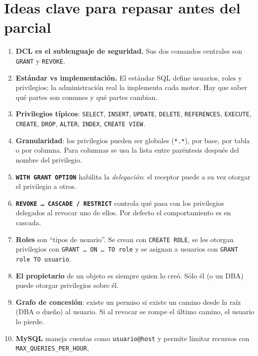 \documentclass[11pt,a4paper]{article}
\begin{document}
\section{Ideas clave para repasar antes del parcial}

\begin{enumerate}
    \item \textbf{DCL es el sublenguaje de seguridad.} Sus dos comandos
    centrales son \texttt{GRANT} y \texttt{REVOKE}.
    \item \textbf{Estándar vs implementación.} El estándar SQL define
    usuarios, roles y privilegios; la administración real la implementa
    cada motor. Hay que saber qué partes son comunes y qué partes
    cambian.
    \item \textbf{Privilegios típicos}: \texttt{SELECT}, \texttt{INSERT},
    \texttt{UPDATE}, \texttt{DELETE}, \texttt{REFERENCES},
    \texttt{EXECUTE}, \texttt{CREATE}, \texttt{DROP}, \texttt{ALTER},
    \texttt{INDEX}, \texttt{CREATE VIEW}.
    \item \textbf{Granularidad}: los privilegios pueden ser globales
    (\texttt{*.*}), por base, por tabla o por columna. Para columnas se
    usa la lista entre paréntesis después del nombre del privilegio.
    \item \textbf{\texttt{WITH GRANT OPTION}} habilita la
    \emph{delegación}: el receptor puede a su vez otorgar el privilegio
    a otros.
    \item \textbf{\texttt{REVOKE \dots\ CASCADE / RESTRICT}} controla
    qué pasa con los privilegios delegados al revocar uno de ellos.
    Por defecto el comportamiento es en cascada.
    \item \textbf{Roles} son ``tipos de usuario''. Se crean con
    \texttt{CREATE ROLE}, se les otorgan privilegios con \texttt{GRANT
    \dots\ ON \dots\ TO role} y se asignan a usuarios con
    \texttt{GRANT role TO usuario}.
    \item \textbf{El propietario} de un objeto es siempre quien lo
    creó. Sólo él (o un DBA) puede otorgar privilegios sobre él.
    \item \textbf{Grafo de concesión}: existe un permiso si existe un
    camino desde la raíz (DBA o dueño) al usuario. Si al revocar se
    rompe el último camino, el usuario lo pierde.
    \item \textbf{MySQL} maneja cuentas como \texttt{usuario@host} y
    permite limitar recursos con \texttt{MAX\_QUERIES\_PER\_HOUR},

\end{enumerate}
\end{document}
